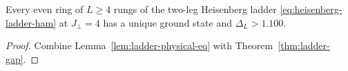 \begin{theorem}
  \label{thm:ladder-physical-gap}
  \leanok
  Every even ring of \(L \ge 4\) rungs of the two-leg Heisenberg ladder
  \eqref{eq:heisenberg-ladder-ham} at \(J_\perp = 4\) has a unique ground state and
  \(\Delta_L > 1.100\).
\end{theorem}
\begin{proof}
  \leanok
  Combine Lemma~\ref{lem:ladder-physical-eq} with Theorem~\ref{thm:ladder-gap}.
\end{proof}

